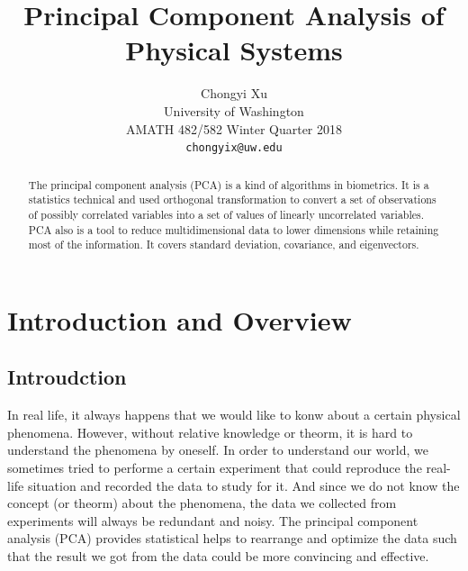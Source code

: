 \documentclass[twoside,twocolumn]{article}
\title{\LARGE \bf
    Principal Component Analysis of Physical Systems
    }
\author{ \parbox{3 in}{\centering Chongyi Xu \\
             University of Washington\\
             AMATH 482/582 Winter Quarter 2018\\
             {\tt\small chongyix@uw.edu}}
    }
\begin{document}
    \maketitle

    \begin{abstract}

    The principal component analysis (PCA) is a kind of algorithms in biometrics. It is a statistics 
    technical and used orthogonal transformation to convert a set of observations of possibly correlated 
    variables into a set of values of linearly uncorrelated variables. PCA also is a tool to reduce 
    multidimensional data to lower dimensions while retaining most of the information. It covers standard 
    deviation, covariance, and eigenvectors.
        
    \end{abstract}

    \linespread{1.05} %
    \section{Introduction and Overview}
    \subsection{Introudction}
    In real life, it always happens that we would like to konw about a certain physical phenomena. However, 
    without relative knowledge or theorm, it is hard to understand the phenomena by oneself. In order to 
    understand our world, we sometimes tried to performe a certain experiment that could reproduce the real-life 
    situation and recorded the data to study for it. And since we do not know the concept (or theorm) about the 
    phenomena, the data we collected from experiments will always be redundant and noisy. The principal component
    analysis (PCA) provides statistical helps to rearrange and optimize the data such that the result we got from
    the data could be more convincing and effective.

\end{document}
